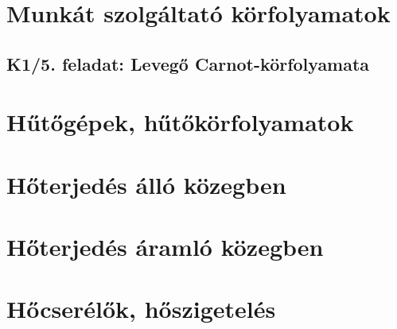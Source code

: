 \documentclass[11pt, a4paper]{report}
\begin{document}
\chapter{Munkát szolgáltató körfolyamatok}

\section*{K1/5. feladat: Levegő Carnot-körfolyamata}



\chapter{Hűtőgépek, hűtőkörfolyamatok}



\chapter{Hőterjedés álló közegben}













\chapter{Hőterjedés áramló közegben}









\chapter{Hőcserélők, hőszigetelés}




\end{document}
